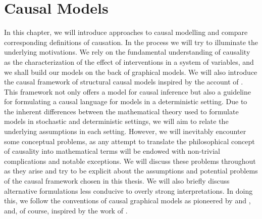 \documentclass[11pt, a4paper]{memoir}
\theoremstyle{break}
\theoremstyle{break}
\theoremstyle{nonumberplain}
\begin{document}
\chapter{Causal Models}
In this chapter, we will introduce approaches to causal modelling and compare corresponding definitions of causation. In the process we will try to illuminate the underlying motivations. We rely on the fundamental understanding of causality as the characterization of the effect of interventions in a system of variables, and we shall build our models on the back of graphical models. We will also introduce the causal framework of structural causal models inspired by the account of \cite{Peters}. This framework not only offers a model for causal inference but also a guideline for formulating a causal language for models in a deterministic setting. Due to the inherent differences between the mathematical theory used to formulate models in stochastic and deterministic settings, we will aim to relate the underlying assumptions in each setting. However, we will inevitably encounter some conceptual problems, as any attempt to translate the philosophical concept of causality into mathematical terms will be endowed with non-trivial complications and notable exceptions. We will discuss these problems throughout as they arise and try to be explicit about the assumptions and potential problems of the causal framework chosen in this thesis. We will also briefly discuss alternative formulations less conducive to overly strong interpretations. In doing this, we follow the conventions of causal graphical  models as pioneered by \cite{Spirtes} and \cite{Pearl}, and, of course, inspired by the work of \cite{Steffen}.
\end{document}
